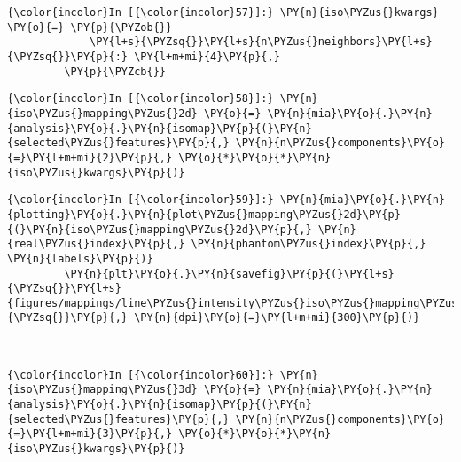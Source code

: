    \begin{Verbatim}[commandchars=\\\{\}]
{\color{incolor}In [{\color{incolor}57}]:} \PY{n}{iso\PYZus{}kwargs} \PY{o}{=} \PY{p}{\PYZob{}}
             \PY{l+s}{\PYZsq{}}\PY{l+s}{n\PYZus{}neighbors}\PY{l+s}{\PYZsq{}}\PY{p}{:} \PY{l+m+mi}{4}\PY{p}{,}
         \PY{p}{\PYZcb{}}
\end{Verbatim}

    \begin{Verbatim}[commandchars=\\\{\}]
{\color{incolor}In [{\color{incolor}58}]:} \PY{n}{iso\PYZus{}mapping\PYZus{}2d} \PY{o}{=} \PY{n}{mia}\PY{o}{.}\PY{n}{analysis}\PY{o}{.}\PY{n}{isomap}\PY{p}{(}\PY{n}{selected\PYZus{}features}\PY{p}{,} \PY{n}{n\PYZus{}components}\PY{o}{=}\PY{l+m+mi}{2}\PY{p}{,} \PY{o}{*}\PY{o}{*}\PY{n}{iso\PYZus{}kwargs}\PY{p}{)}
\end{Verbatim}

    \begin{Verbatim}[commandchars=\\\{\}]
{\color{incolor}In [{\color{incolor}59}]:} \PY{n}{mia}\PY{o}{.}\PY{n}{plotting}\PY{o}{.}\PY{n}{plot\PYZus{}mapping\PYZus{}2d}\PY{p}{(}\PY{n}{iso\PYZus{}mapping\PYZus{}2d}\PY{p}{,} \PY{n}{real\PYZus{}index}\PY{p}{,} \PY{n}{phantom\PYZus{}index}\PY{p}{,} \PY{n}{labels}\PY{p}{)}
         \PY{n}{plt}\PY{o}{.}\PY{n}{savefig}\PY{p}{(}\PY{l+s}{\PYZsq{}}\PY{l+s}{figures/mappings/line\PYZus{}intensity\PYZus{}iso\PYZus{}mapping\PYZus{}2d.png}\PY{l+s}{\PYZsq{}}\PY{p}{,} \PY{n}{dpi}\PY{o}{=}\PY{l+m+mi}{300}\PY{p}{)}
\end{Verbatim}

    \begin{center}
    \end{center}
    { \hspace*{\fill} \\}

    \begin{Verbatim}[commandchars=\\\{\}]
{\color{incolor}In [{\color{incolor}60}]:} \PY{n}{iso\PYZus{}mapping\PYZus{}3d} \PY{o}{=} \PY{n}{mia}\PY{o}{.}\PY{n}{analysis}\PY{o}{.}\PY{n}{isomap}\PY{p}{(}\PY{n}{selected\PYZus{}features}\PY{p}{,} \PY{n}{n\PYZus{}components}\PY{o}{=}\PY{l+m+mi}{3}\PY{p}{,} \PY{o}{*}\PY{o}{*}\PY{n}{iso\PYZus{}kwargs}\PY{p}{)}
\end{Verbatim}

